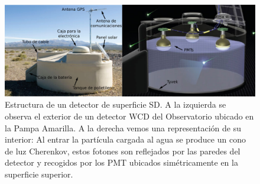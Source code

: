 \begin{figure}[!ht]
  \centering
\includegraphics[width=1\textwidth]{Figs/SD_componentes.png}
  \caption{Estructura de un detector de superficie SD. A la izquierda se observa el exterior de un detector WCD del Observatorio ubicado en la Pampa Amarilla. A la derecha vemos una representación de su interior: Al entrar la partícula cargada al agua se produce un cono de luz Cherenkov, estos fotones son reflejados por las paredes del detector y recogidos por los PMT ubicados simétricamente en la superficie superior. \cite{SD_auger}}
  \label{fig:SD_auger}
\end{figure}




